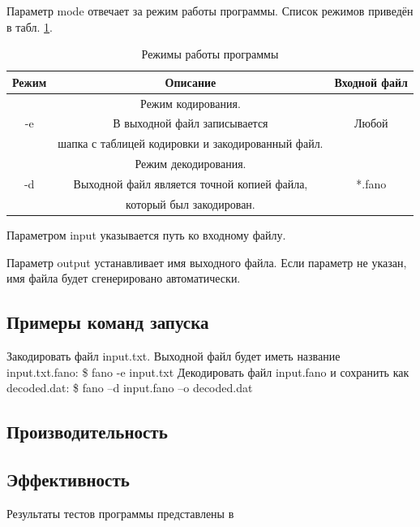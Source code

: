 \documentclass{article}
\begin{document}
Параметр mode отвечает за режим работы программы. Список режимов приведён в табл. \ref{modes}.

\begin{table}
 \begin{center}
  \begin{tabular}{|c|c|c|}
   \hline
   Режим & Описание & Входной файл\\
   \hline
    & Режим кодирования.  & \\ 
   -e & В выходной файл записывается & Любой \\
    & шапка с таблицей кодировки и закодированный файл. & \\
   \hline
    & Режим декодирования. & \\
   -d & Выходной файл является точной копией файла, & *.fano\\ 
    & который был закодирован. & \\
   \hline
  \end{tabular}

 \end{center}
  \caption{Режимы работы программы\label{modes}}
\end{table}


Параметром input указывается путь ко входному файлу.

Параметр output устанавливает имя выходного файла. Если параметр не указан, имя файла будет сгенерировано автоматически.

\subsection{Примеры команд запуска}
Закодировать файл input.txt. Выходной файл будет иметь название input.txt.fano:
\$ fano -e input.txt 
Декодировать файл input.fano и сохранить как decoded.dat:
\$ fano –d input.fano –o decoded.dat

\subsection{Производительность} 
\subsection{Эффективность}
Результаты тестов программы представлены в
\end{document}
